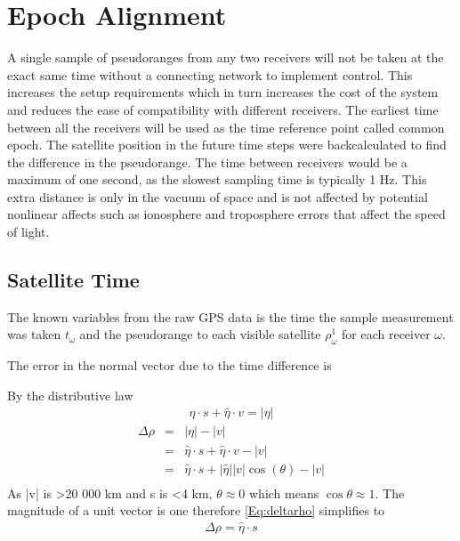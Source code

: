 
\section{Epoch Alignment}

A single sample of pseudoranges from any two receivers will not be taken at the exact same time without a connecting network to implement control. This increases the setup requirements which in turn increases the cost of the system and reduces the ease of compatibility with different receivers. The earliest time between all the receivers will be used as the time reference point called common epoch. The satellite position in the future time steps were backcalculated to find the difference in the pseudorange. The time between receivers would be a maximum of one second, as the slowest sampling time is typically 1 Hz. This extra distance is only in the vacuum of space and is not affected by potential nonlinear affects such as ionosphere and troposphere errors that affect the speed of light.\\

\subsection{Satellite Time}
The known variables from the raw GPS data is the time the sample measurement was taken $t_\omega$ and the pseudorange to each visible satellite $\rho_\omega^1$ for each receiver $\omega$.


The error in the normal vector due to the time difference is

By the distributive law
\begin{eqnarray}
\hat{\eta}\cdot s + \hat{\eta}\cdot v = |\eta| 
\end{eqnarray}
\begin{eqnarray}
\Delta \rho &=& |\eta| - |v|\\ %
&=& \hat{\eta}\cdot s + \hat{\eta}\cdot v - |v|\\
&=& \hat{\eta}\cdot s + |\hat{\eta}||v|\cos(\theta) - |v| \label{Eq:deltarho}\\
\end{eqnarray}
As |v| is >20 000 km and s is <4 km, $\theta\approx 0$ which means $\cos\theta\approx1$. The magnitude of a unit vector is one therefore \eqref{Eq:deltarho} simplifies to
\begin{eqnarray}
\Delta\rho = \hat{\eta}\cdot s 
\end{eqnarray}


